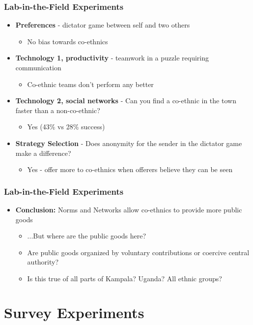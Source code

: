 \documentclass[xcolor=x11names,compress]{beamer}\usepackage[]{graphicx}\usepackage[]{color}
\renewcommand{\(}{\begin{columns}}
\renewcommand{\)}{\end{columns}}
\newcommand{\<}[1]{\begin{column}{#1}}
\renewcommand{\>}{\end{column}}
\begin{document}
\begin{frame}
\frametitle{Lab-in-the-Field Experiments}
\begin{itemize}
\item \textbf{Preferences} - dictator game between self and two others
\begin{itemize}
\item No bias towards co-ethnics
\pause
\end{itemize}
\item \textbf{Technology 1, productivity} - teamwork in a puzzle requiring communication
\begin{itemize}
\item Co-ethnic teams don't perform any better
\pause
\end{itemize}
\item \textbf{Technology 2, social networks} - Can you find a co-ethnic in the town faster than a non-co-ethnic?
\begin{itemize}
\item  Yes (43\% vs 28\% success)
\pause
\end{itemize}
\item \textbf{Strategy Selection} - Does anonymity for the sender in the dictator game make a difference?
\begin{itemize}
\item Yes - offer more to co-ethnics when offerers believe they can be seen
\end{itemize}
\end{itemize}
\end{frame}

\begin{frame}
\frametitle{Lab-in-the-Field Experiments}
\begin{itemize}
\item \textbf{Conclusion:} Norms and Networks allow co-ethnics to provide more public goods
\pause
\begin{itemize}
\item ...But where are the public goods here?
\item Are public goods organized by voluntary contributions or coercive central authority?
\item Is this true of all parts of Kampala? Uganda? All ethnic groups?
\end{itemize}
\end{itemize}
\end{frame}

\section{Survey Experiments}
\end{document}
